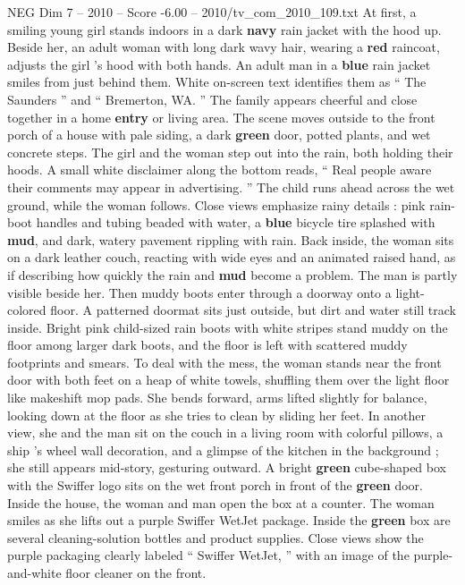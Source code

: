 \begin{textsample}{NEG Dim 7 – 2010 – Score -6.00 – 2010/tv\_com\_2010\_109.txt}  \label{ex:f7_neg_041}
At first, a smiling young girl stands indoors in a dark \textbf{navy} rain jacket with the hood up.
Beside her, an adult woman with long dark wavy hair, wearing a \textbf{red} raincoat, adjusts the girl ’s hood with both hands.
An adult man in a \textbf{blue} rain jacket smiles from just behind them.
White on-screen text identifies them as “ The Saunders ” and “ Bremerton, WA. ” The family appears cheerful and close together in a home \textbf{entry} or living area.
The scene moves outside to the front porch of a house with pale siding, a dark \textbf{green} door, potted plants, and wet concrete steps.
The girl and the woman step out into the rain, both holding their hoods.
A small white disclaimer along the bottom reads, “ Real people aware their comments may appear in advertising. ” The child runs ahead across the wet ground, while the woman follows.
Close views emphasize rainy details : pink rain-boot handles and tubing beaded with water, a \textbf{blue} bicycle tire splashed with \textbf{mud}, and dark, watery pavement rippling with rain.
Back inside, the woman sits on a dark leather couch, reacting with wide eyes and an animated raised hand, as if describing how quickly the rain and \textbf{mud} become a problem.
The man is partly visible beside her.
Then muddy boots enter through a doorway onto a light-colored floor.
A patterned doormat sits just outside, but dirt and water still track inside.
Bright pink child-sized rain boots with white stripes stand muddy on the floor among larger dark boots, and the floor is left with scattered muddy footprints and smears.
To deal with the mess, the woman stands near the front door with both feet on a heap of white towels, shuffling them over the light floor like makeshift mop pads.
She bends forward, arms lifted slightly for balance, looking down at the floor as she tries to clean by sliding her feet.
In another view, she and the man sit on the couch in a living room with colorful pillows, a ship ’s wheel wall decoration, and a glimpse of the kitchen in the background ; she still appears mid-story, gesturing outward.
A bright \textbf{green} cube-shaped box with the Swiffer logo sits on the wet front porch in front of the \textbf{green} door.
Inside the house, the woman and man open the box at a counter.
The woman smiles as she lifts out a purple Swiffer WetJet package.
Inside the \textbf{green} box are several cleaning-solution bottles and product supplies.
Close views show the purple packaging clearly labeled “ Swiffer WetJet, ” with an image of the purple-and-white floor cleaner on the front.

\end{textsample}
